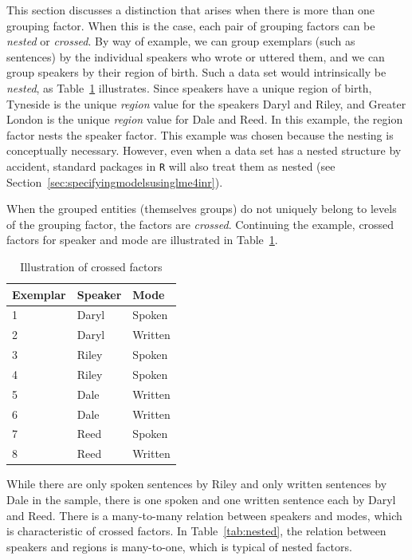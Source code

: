 This section discusses a distinction that arises when there is more than one grouping factor.
When this is the case, each pair of grouping factors can be \textit{nested} or \textit{crossed}.
By way of example, we can group exemplars (such as sentences) by the individual speakers who wrote or uttered them, and we can group speakers by their region of birth.
Such a data set would intrinsically be \textit{nested}, as Table~\ref{tab:crossed} illustrates.
Since speakers have a unique region of birth, Tyneside is the unique \textit{region} value for the speakers Daryl and Riley, and Greater London is the unique \textit{region} value for Dale and Reed.
In this example, the region factor nests the speaker factor.
This example was chosen because the nesting is conceptually necessary.
However, even when a data set has a nested structure by accident, standard packages in \texttt{R} will also treat them as nested (see Section~\ref{sec:specifyingmodelsusinglme4inr}).

When the grouped entities (themselves groups) do not uniquely belong to levels of the grouping factor, the factors are \textit{crossed}.
Continuing the example, crossed factors for speaker and mode are illustrated in Table~\ref{tab:crossed}.
%
\begin{table}
  \centering
  \begin{tabular}{lll}
    \toprule
    \textbf{Exemplar} & \textbf{Speaker}  & \textbf{Mode}   \\
    \midrule
                    1 &           Daryl  &         Spoken  \\
                    2 &           Daryl  &         Written \\
                    3 &           Riley  &         Spoken  \\
                    4 &           Riley  &         Spoken  \\
                    5 &           Dale   &         Written \\
                    6 &           Dale   &         Written \\
                    7 &           Reed   &         Spoken  \\
                    8 &           Reed   &         Written \\
    \bottomrule
  \end{tabular}
  \caption{Illustration of crossed factors}
  \label{tab:crossed}
\end{table}
%
While there are only spoken sentences by Riley and only written sentences by Dale in the sample, there is one spoken and one written sentence each by Daryl and Reed.
There is a many-to-many relation between speakers and modes, which is characteristic of crossed factors.
In Table~\ref{tab:nested}, the relation between speakers and regions is many-to-one, which is typical of nested factors.

